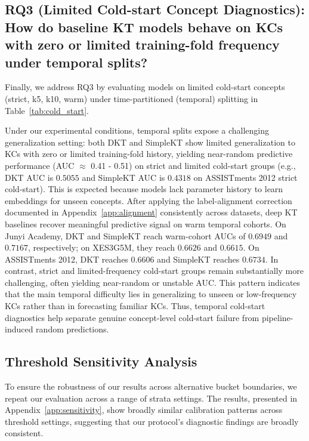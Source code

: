 \subsection{RQ3 (Limited Cold-start Concept Diagnostics): How do baseline KT models behave on KCs with zero or limited training-fold frequency under temporal splits?}
Finally, we address RQ3 by evaluating models on limited cold-start concepts (strict, k5, k10, warm) under time-partitioned (temporal) splitting in Table~\ref{tab:cold_start}.


\FloatBarrier

Under our experimental conditions, temporal splits expose a challenging generalization setting: both DKT and SimpleKT show limited generalization to KCs with zero or limited training-fold history, yielding near-random predictive performance (AUC $\approx$ 0.41 - 0.51) on strict and limited cold-start groups (e.g., DKT AUC is $0.5055$ and SimpleKT AUC is $0.4318$ on ASSISTments 2012 strict cold-start). This is expected because models lack parameter history to learn embeddings for unseen concepts. After applying the label-alignment correction documented in Appendix~\ref{app:alignment} consistently across datasets, deep KT baselines recover meaningful predictive signal on warm temporal cohorts. On Junyi Academy, DKT and SimpleKT reach warm-cohort AUCs of $0.6949$ and $0.7167$, respectively; on XES3G5M, they reach $0.6626$ and $0.6615$. On ASSISTments 2012, DKT reaches $0.6606$ and SimpleKT reaches $0.6734$. In contrast, strict and limited-frequency cold-start groups remain substantially more challenging, often yielding near-random or unstable AUC. This pattern indicates that the main temporal difficulty lies in generalizing to unseen or low-frequency KCs rather than in forecasting familiar KCs. Thus, temporal cold-start diagnostics help separate genuine concept-level cold-start failure from pipeline-induced random predictions.

\subsection{Threshold Sensitivity Analysis}
To ensure the robustness of our results across alternative bucket boundaries, we repeat our evaluation across a range of strata settings. The results, presented in Appendix~\ref{app:sensitivity}, show broadly similar calibration patterns across threshold settings, suggesting that our protocol's diagnostic findings are broadly consistent.

